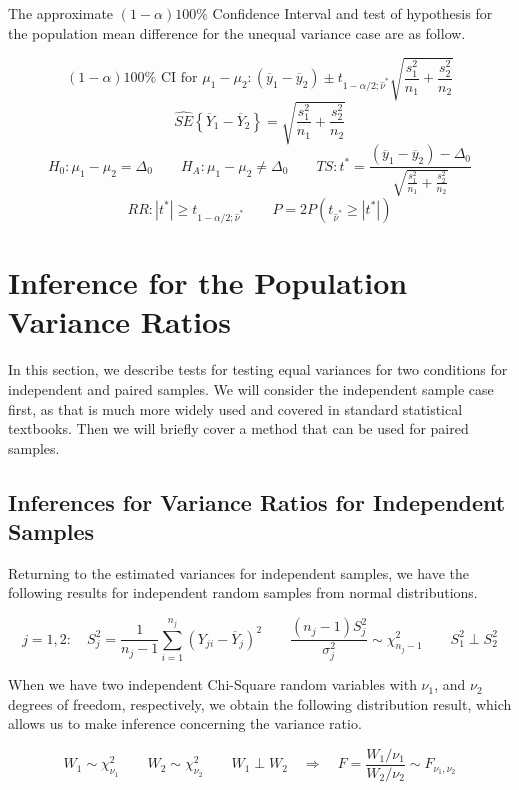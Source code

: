 \documentclass[
]{book}
\begin{document}
The approximate \((1-\alpha)100\%\) Confidence Interval and test of
hypothesis for the population mean difference for the unequal variance
case are as follow.

\[
(1-\alpha)100\% \mbox{ CI for } \mu_1-\mu_2:
\left(\overline{y}_1-\overline{y}_2\right) \pm 
t_{1-\alpha/2;\hat{\nu}^*}\sqrt{\frac{s_1^2}{n_1}+\frac{s_2^2}{n_2}}
\] \[
\hat{SE}\left\{\overline{Y}_1-\overline{Y}_2\right\}=
\sqrt{\frac{s_1^2}{n_1}+\frac{s_2^2}{n_2}}
\] \[
H_0:\mu_1-\mu_2=\Delta_0 \qquad H_A:\mu_1-\mu_2 \neq \Delta_0 \qquad 
TS:t^*=\frac{\left(\overline{y}_1-\overline{y}_2\right)-\Delta_0}{
\sqrt{\frac{s_1^2}{n_1}+\frac{s_2^2}{n_2}}}
\] \[
RR:|t^*|\geq t_{1-\alpha/2;\hat{\nu}^*} 
\qquad P=2P\left(t_{\hat{\nu}^*}\geq|t^*|\right)
\]

\section{Inference for the Population Variance
Ratios}\label{inference-for-the-population-variance-ratios}

In this section, we describe tests for testing equal variances for two
conditions for independent and paired samples. We will consider the
independent sample case first, as that is much more widely used and
covered in standard statistical textbooks. Then we will briefly cover a
method that can be used for paired samples.

\subsection{Inferences for Variance Ratios for Independent
Samples}\label{inferences-for-variance-ratios-for-independent-samples}

Returning to the estimated variances for independent samples, we have
the following results for independent random samples from normal
distributions.

\[
j=1,2: \quad S_j^2=\frac{1}{n_j-1}\sum_{i=1}^{n_j}\left(Y_{ji}-\overline{Y}_j\right)^2
\qquad \frac{\left(n_j-1\right)S_j^2}{\sigma_j^2}\sim \chi_{n_j-1}^2 \qquad
S_1^2 \perp S_2^2
\]

When we have two independent Chi-Square random variables with \(\nu_1\),
and \(\nu_2\) degrees of freedom, respectively, we obtain the following
distribution result, which allows us to make inference concerning the
variance ratio.

\[
W_1 \sim \chi_{\nu_1}^2 \qquad W_2 \sim \chi_{\nu_2}^2 \qquad W_1\perp W_2
\quad \Rightarrow \quad F=\frac{W_1/{\nu_1}}{W_2/{\nu_2}}\sim F_{\nu_1,\nu_2}
\]
\end{document}
